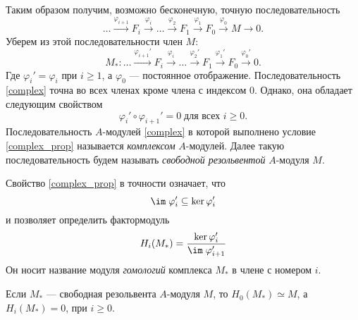     Таким образом получим, возможно бесконечную, точную последовательность
    \begin{equation*}
        \dots \xrightarrow{\varphi_{i + 1}} F_{i} \xrightarrow{\varphi_{i}} \dots \xrightarrow{\varphi_2} F_1 \xrightarrow{\varphi_1} F_0 \xrightarrow{\varphi_0} M \rightarrow 0.
    \end{equation*}
    Уберем из этой последовательности член $M$:
    \begin{equation}\label{complex}
        M_* : \dots \xrightarrow{\varphi_{i + 1}'} F_{i} \xrightarrow{\varphi_{i}} \dots \xrightarrow{\varphi_2'} F_1 \xrightarrow{\varphi_1'} F_0 \xrightarrow{\varphi_0'} 0. 
    \end{equation}
    Где $\varphi_i' = \varphi_i$ при $i \geqslant 1$, а $\varphi_0$ --- постоянное отображение. Последовательность \eqref{complex} точна во всех членах кроме члена с индексом 0. Однако,
    она обладает следующим свойством 
    \begin{equation}\label{complex_prop}
        \varphi_i' \circ \varphi_{i+1}' = 0\; \text{для всех } i \geqslant 0. 
    \end{equation}
    Последовательность $A$-модулей \eqref{complex} в которой выполнено условие \eqref{complex_prop} называется \textit{комплексом} $A$-модулей. Далее такую последовательность
    будем называть \textit{свободной резольвентой} $A$-модуля $M$.

    Свойство \eqref{complex_prop} в точности означает, что 
    $$\im\; \varphi_i' \subseteq \ker \varphi_i'$$
    и позволяет определить фактормодуль 
    \begin{equation} \label{homology}
        H_i(M_*) = \frac{\ker \varphi_i'}{\im\;\varphi_{i+1}'}
    \end{equation}
    Он носит название модуля \textit{гомологий} комплекса $M_*$ в члене с номером $i$.

    Если $M_*$ --- свободная резольвента $A$-модуля $M$, то $H_0(M_*) \simeq M$, а $H_i(M_*) = 0$, при $i \geqslant 0$.


